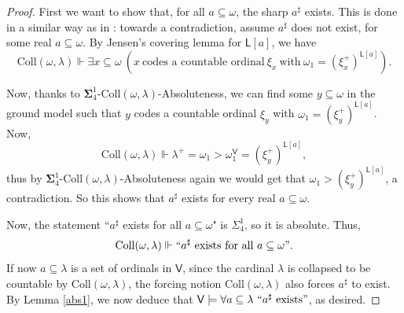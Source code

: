 \documentclass[10pt]{amsart}
\theoremstyle{definition}
\begin{document}
\begin{proof}
  First we want to show that, for all $a\subseteq\omega$, the sharp $a^\sharp$ exists. This is done in a similar way as in \cite[Lemma 3.13]{Kai}: towards a contradiction, assume $a^\sharp$ does not exist, for some real $a\subseteq\omega$. By Jensen's covering lemma for $\mathsf L[a]$, we have
\[\mathrm{Coll}(\omega,\lambda)\Vdash \exists x\subseteq\omega\ (x\ \text{codes a countable ordinal}\ \xi_x\ \text{with}\ \omega_1=(\xi_x^+)^{\mathsf L[a]}).\] 

Now, thanks to $\boldsymbol\Sigma^1_4$-$\mathrm{Coll}(\omega,\lambda)$-Absoluteness, we can find some $y\subseteq\omega$ in the ground model such that $y$ codes a countable ordinal $\xi_y$ with $\omega_1=(\xi_y^+)^{\mathsf L[a]}$. Now,
\[\mathrm{Coll}(\omega,\lambda)\Vdash \lambda^+=\omega_1 > \omega_1^{\mathsf V}=(\xi_y^+)^{\mathsf L[a]},\]
thus by $\boldsymbol\Sigma^1_4$-$\mathrm{Coll}(\omega,\lambda)$-Absoluteness again we would get that $\omega_1>(\xi_y^+)^{\mathsf L[a]}$, a contradiction. So this shows that $a^\sharp$ exists for every real $a\subseteq\omega$.\medskip

Now, the statement ``$a^\sharp$ exists for all $a\subseteq\omega$" is $\Sigma^1_4$, so it is absolute. Thus,
\[\mathrm{Coll}(\omega,\lambda)\Vdash ``a^\sharp\ \text{exists for all }a\subseteq\omega".\]
If now $a\subseteq\lambda$ is a set of ordinals in $\mathsf V$, since the cardinal $\lambda$ is collapsed to be countable by $\mathrm{Coll}(\omega,\lambda)$, the forcing notion $\mathrm{Coll}(\omega,\lambda)$ also forces $a^\sharp$ to exist. By Lemma \ref{abs1}, we now deduce that $\mathsf V\models \forall a\subseteq\lambda \ ``a^\sharp\ \text{exists}"$, as desired.
\end{proof}






\end{document}
